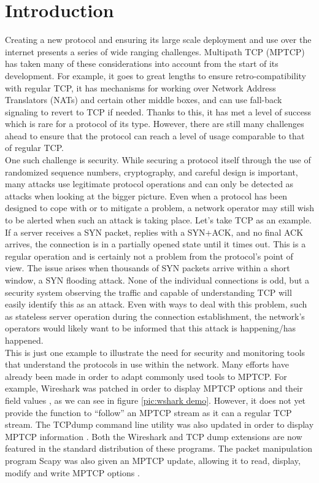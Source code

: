 \chapter{Introduction} \label{chap:intro}
Creating a new protocol and ensuring its large scale deployment and use over the internet presents a series of wide ranging challenges. Multipath TCP (MPTCP) has taken many of these considerations into account from the start of its development. For example, it goes to great lengths to ensure retro-compatibility with regular TCP, it has mechanisms for working over Network Address Translators (NATs) and certain other middle boxes, and can use fall-back signaling to revert to TCP if needed. Thanks to this, it has met a level of success which is rare for a protocol of its type. However, there are still many challenges ahead to ensure that the protocol can reach a level of usage comparable to that of regular TCP. \\

One such challenge is security. While securing a protocol itself through the use of randomized  sequence numbers, cryptography, and careful design is important, many attacks use legitimate protocol operations and can only be detected as attacks when looking at the bigger picture. Even when a protocol has been designed to cope with or to mitigate a problem, a network operator may still wish to be alerted when such an attack is taking place. Let's take TCP as an example. If a server receives a SYN packet, replies with a SYN+ACK, and no final ACK arrives, the connection is in a partially opened state until it times out. This is a regular operation and is certainly not a problem from the protocol's point of view. The issue arises when thousands of SYN packets arrive within a short window, a SYN flooding attack. None of the individual connections is odd, but a security system observing the traffic and capable of understanding TCP will easily identify this as an attack. Even with ways to deal with this problem, such as stateless server operation during the connection establishment, the network's operators would likely want to be informed that this attack is happening/has happened. \\

This is just one example to illustrate the need for security and monitoring tools that understand the protocols in use within the network. Many efforts have already been made in order to adapt commonly used tools to MPTCP. For example, Wireshark \cite{wireshark} was patched in order to display MPTCP options and their field values \cite{mpwireshark}, as we can  see in figure \ref{pic:wshark demo}. However, it does not yet provide the function to ``follow'' an MPTCP stream as it can a regular TCP stream. The TCPdump \cite{tcpdump} command line utility was also updated in order to display MPTCP information \cite{mptcpdump}. Both the Wireshark and TCP dump extensions are now featured in the standard distribution of these programs. The packet manipulation program Scapy \cite{scapy} was also given an MPTCP update, allowing it to read, display, modify and write MPTCP options \cite{mpscapy} .   \\

